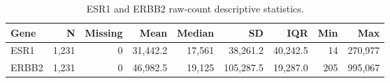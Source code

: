\begin{table}[H]

\caption{\label{tab:export-latex-tables}ESR1 and ERBB2 raw-count descriptive statistics.}
\centering
\begin{tabular}[t]{lrrrrrrrr}
\toprule
Gene & N & Missing & Mean & Median & SD & IQR & Min & Max\\
\midrule
ESR1 & 1,231 & 0 & 31,442.2 & 17,561 & 38,261.2 & 40,242.5 & 14 & 270,977\\
ERBB2 & 1,231 & 0 & 46,982.5 & 19,125 & 105,287.5 & 19,287.0 & 205 & 995,067\\
\bottomrule
\end{tabular}
\end{table}
